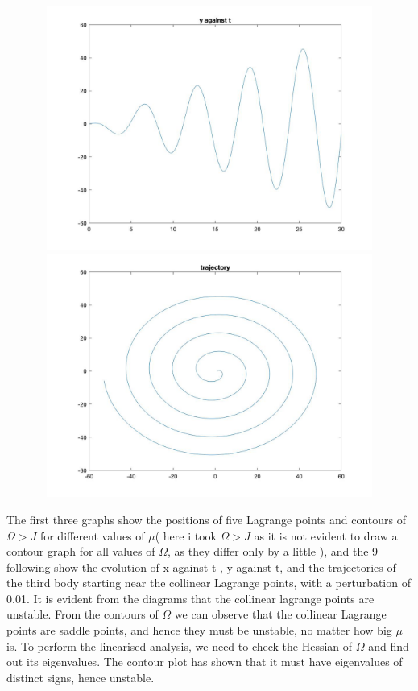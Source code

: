 \documentclass[11pt]{article}
\begin{document}
\begin{figure}[H]
\includegraphics[width = 12cm, height = 8cm]{Q4(11)}
\includegraphics[width = 12cm, height = 8cm]{Q4(12)}
\end{figure}
The first three graphs show the positions of five Lagrange points and contours of $\Omega > J$ for different values of $\mu$( here i took $\Omega>J$ as it is not evident to draw a contour graph for all values of $\Omega$, as they differ only by a little ), and the 9 following show the evolution of x against t , y against t, and the trajectories of the third body starting near the collinear Lagrange points, with a perturbation of 0.01. It is evident from the diagrams that the collinear lagrange points are unstable. From the contours of $\Omega$ we can observe that the collinear Lagrange points are saddle points, and hence they must be unstable, no matter how big $\mu$ is. To perform the linearised analysis, we need to check the Hessian of $\Omega$ and find out its eigenvalues. The contour plot has shown that it must have eigenvalues of distinct signs, hence unstable.
\end{document}
